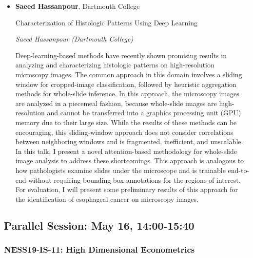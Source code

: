 \begin{itemize}
\item \textbf{Saeed Hassanpour}, Dartmouth College

Characterization of Histologic Patterns Using Deep Learning

\emph{\footnotesize Saeed Hassanpour (Dartmouth College)}

Deep-learning-based methods have recently shown promising results in analyzing and characterizing histologic patterns on high-resolution microscopy images. The common approach in this domain involves a sliding window for cropped-image classification, followed by heuristic aggregation methods for whole-slide inference. In this approach, the microscopy images are analyzed in a piecemeal fashion, because whole-slide images are high-resolution and cannot be transferred into a graphics processing unit (GPU) memory due to their large size. While the results of these methods can be encouraging, this sliding-window approach does not consider correlations between neighboring windows and is fragmented, inefficient, and unscalable. In this talk, I present a novel attention-based methodology for whole-slide image analysis to address these shortcomings. This approach is analogous to how pathologists examine slides under the microscope and is trainable end-to-end without requiring bounding box annotations for the regions of interest. For evaluation, I will present some preliminary results of this approach for the identification of esophageal cancer on microscopy images.

\end{itemize}

\subsection*{Parallel Session: May 16, 14:00-15:40}

\subsubsection*{NESS19-IS-11: High Dimensional Econometrics}

